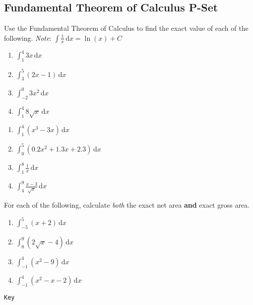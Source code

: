 \documentclass{article}
\newcounter{pset}
\newcommand{\indefint}[1]{\displaystyle \int {#1} \, \mathrm{d}x}
\newcommand{\defint}[3]{\displaystyle \int_{#1}^{#2} {#3} \, \mathrm{d}x}
\begin{document}
\subsection*{Fundamental Theorem of Calculus P-Set}

Use the Fundamental Theorem of Calculus to find the exact value of each of the following. \emph{Note}: $\indefint{\frac{1}{x}} = \ln(x) + C$    \bigskip 
\begin{multicols}{4}
\begin{enumerate}
    \item $\defint{1}{4}{3x}$
    \item $\defint{3}{5}{(2x-1)}$
    \item $\defint{-2}{0}{3x^2}$
    \item $\defint{1}{4}{8\sqrt{x}}$
\end{enumerate}     \setcounter{pset}{\value{enumi}}
\end{multicols}
\smallskip 

\begin{multicols}{4}
\begin{enumerate}   \setcounter{enumi}{\value{pset}}
    \item $\defint{1}{4}{(x^3-3x)}$
    \item $\defint{0}{5}{(0.2x^2+1.3x+2.3)}$
    \item $\defint{1}{8}{\frac{1}{x}}$
    \item $\defint{4}{9}{\frac{x-3}{\sqrt{x}}}$
\end{enumerate}     \setcounter{pset}{\value{enumi}}
\end{multicols}
\smallskip 

For each of the following, calculate \emph{both} the exact net area \textbf{and} exact gross area.
\begin{multicols}{4}
\begin{enumerate}   \setcounter{enumi}{\value{pset}}
    \item $\defint{-5}{5}{(x+2)}$
    \item $\defint{0}{9}{(2\sqrt{x}-4)}$
    \item $\defint{-1}{4}{(x^2-9)}$
    \item $\defint{-1}{4}{(x^2-x-2)}$
\end{enumerate}     \setcounter{pset}{\value{enumi}}
\end{multicols}

\vfill 

\dotfill \newline 
\texttt{Key}
\end{document}
